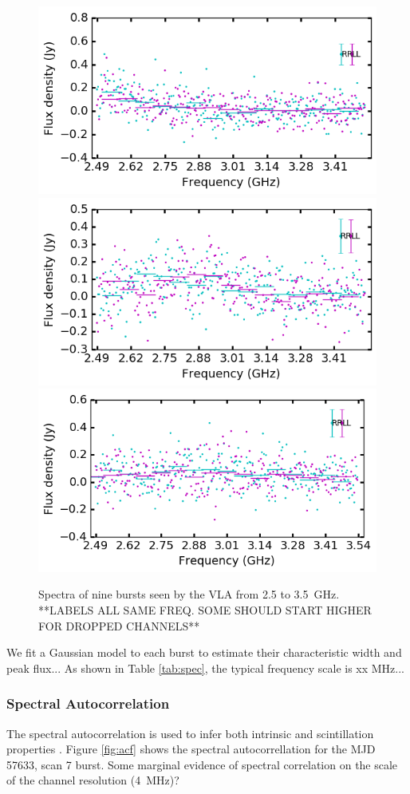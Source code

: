 \documentclass{emulateapj}
\begin{document}
\begin{figure}[h!]
\begin{center}
 \begin{minipage}{2\columnwidth}
  \includegraphics[width=0.3\columnwidth]{spec_57646.png}
  \includegraphics[width=0.3\columnwidth]{spec_57648.png}
  \includegraphics[width=0.3\columnwidth]{spec_57649.png}
 \end{minipage}
\caption{Spectra of nine bursts seen by the VLA from 2.5 to 3.5~GHz.  **LABELS ALL SAME FREQ. SOME SHOULD START HIGHER FOR DROPPED CHANNELS**
\label{fig:spec}}
\end{center}
\end{figure}

We fit a Gaussian model to each burst to estimate their characteristic width and peak flux... As shown in Table \ref{tab:spec}, the typical frequency scale is xx MHz...

\subsubsection{Spectral Autocorrelation}
The spectral autocorrelation is used to infer both intrinsic and scintillation properties \citep{}. Figure \ref{fig:acf} shows the spectral autocorrellation for the MJD 57633, scan 7 burst. Some marginal evidence of spectral correlation on the scale of the channel resolution (4~MHz)?
\end{document}
